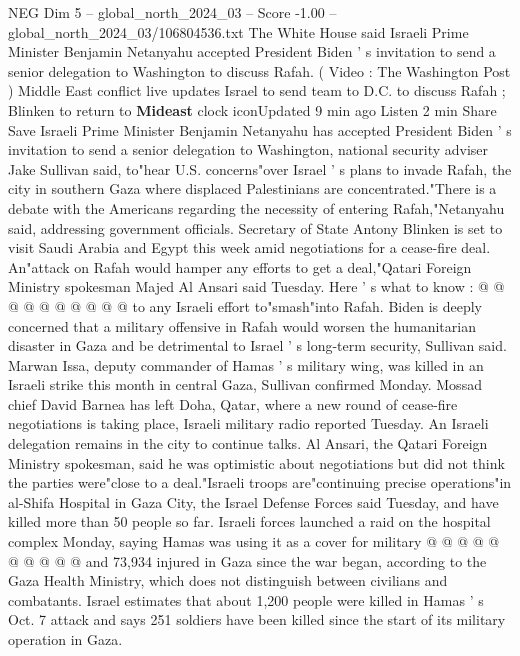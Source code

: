 \begin{textsample}{NEG Dim 5 – global\_north\_2024\_03 – Score -1.00 – global\_north\_2024\_03/106804536.txt}  \label{ex:f5_neg_167}
The White House said Israeli Prime Minister Benjamin Netanyahu accepted President Biden ' s invitation to send a senior delegation to Washington to discuss Rafah. ( Video : The Washington Post ) Middle East conflict live updates Israel to send team to D.C. to discuss Rafah ; Blinken to return to \textbf{Mideast} clock iconUpdated 9 min ago Listen 2 min Share Save Israeli Prime Minister Benjamin Netanyahu has accepted President Biden ' s invitation to send a senior delegation to Washington, national security adviser Jake Sullivan said, to"hear U.S. concerns"over Israel ' s plans to invade Rafah, the city in southern Gaza where displaced Palestinians are concentrated."There is a debate with the Americans regarding the necessity of entering Rafah,"Netanyahu said, addressing government officials.
Secretary of State Antony Blinken is set to visit Saudi Arabia and Egypt this week amid negotiations for a cease-fire deal.
An"attack on Rafah would hamper any efforts to get a deal,"Qatari Foreign Ministry spokesman Majed Al Ansari said Tuesday.
Here ' s what to know : @ @ @ @ @ @ @ @ @ @ to any Israeli effort to"smash"into Rafah.
Biden is deeply concerned that a military offensive in Rafah would worsen the humanitarian disaster in Gaza and be detrimental to Israel ' s long-term security, Sullivan said.
Marwan Issa, deputy commander of Hamas ' s military wing, was killed in an Israeli strike this month in central Gaza, Sullivan confirmed Monday.
Mossad chief David Barnea has left Doha, Qatar, where a new round of cease-fire negotiations is taking place, Israeli military radio reported Tuesday.
An Israeli delegation remains in the city to continue talks.
Al Ansari, the Qatari Foreign Ministry spokesman, said he was optimistic about negotiations but did not think the parties were"close to a deal."Israeli troops are"continuing precise operations"in al-Shifa Hospital in Gaza City, the Israel Defense Forces said Tuesday, and have killed more than 50 people so far.
Israeli forces launched a raid on the hospital complex Monday, saying Hamas was using it as a cover for military @ @ @ @ @ @ @ @ @ @ and 73,934 injured in Gaza since the war began, according to the Gaza Health Ministry, which does not distinguish between civilians and combatants.
Israel estimates that about 1,200 people were killed in Hamas ' s Oct. 7 attack and says 251 soldiers have been killed since the start of its military operation in Gaza.

\end{textsample}
